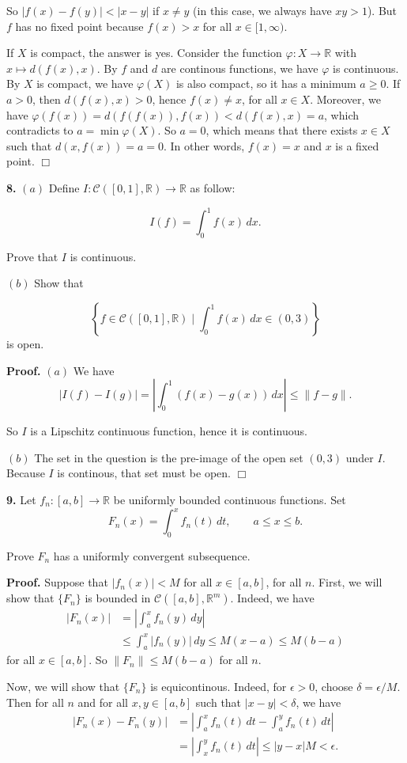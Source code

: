 \documentclass{article}
\begin{document}
So $|f(x) - f(y)| < |x-y|$ if $x\ne y$ (in this case, we always have
$xy > 1$). But $f$ has no fixed point because $f(x) > x$ for all
$x\in [1,\infty)$.

If $X$ is compact, the answer is yes. Consider the function
$\varphi : X\to\mathbb{R}$ with $x\mapsto d(f(x),x)$. By $f$ and $d$ are
continous functions, we have $\varphi$ is continuous. By $X$ is compact,
we have $\varphi(X)$ is also compact, so it has a minimum $a\ge 0$. If
$a > 0$, then $d(f(x),x) > 0$, hence $f(x) \ne x$, for all $x\in X$.
Moreover, we have $\varphi(f(x)) = d(f(f(x)),f(x)) < d(f(x),x) = a$,
which contradicts to $a = \min \varphi(X)$. So $a= 0$, which means that
there exists $x\in X$ such that $d(x,f(x)) = a= 0$. In other words,
$f(x) = x$ and $x$ is a fixed point. $\Box$

    \textbf{8.} $(a)$ Define
$I : \mathcal{C}([0,1], \mathbb{R}) \to \mathbb{R}$ as follow:

\[I(f) =\int_0^1 f(x)\,dx.\]

Prove that $I$ is continuous.

$(b)$ Show that

\[\left\{ f\in\mathcal{C}([0,1], \mathbb{R}) \mid \int_0^1 f(x) \, dx \in (0,3)\right\} \]
is open.

\textbf{Proof.} $(a)$ We have
\[| I(f) - I(g) | = \left|\int_0^1 (f(x) - g(x)) \,dx \right| \le \|f - g\|.\]

So $I$ is a Lipschitz continuous function, hence it is continuous.

$(b)$ The set in the question is the pre-image of the open set $(0,3)$
under $I$. Because $I$ is continous, that set must be open. $\Box$

    \textbf{9.} Let $f_n:[a,b]\to \mathbb{R}$ be uniformly bounded
continuous functions. Set
\[F_n(x) = \int_0^x f_n(t)\,dt,\qquad a\le x \le b.\]

Prove $F_n$ has a uniformly convergent subsequence.

\textbf{Proof.} Suppose that $|f_n(x)| < M$ for all $x\in [a,b]$, for
all $n$. First, we will show that $\{F_n\}$ is bounded in
$\mathcal{C}([a,b],\mathbb{R}^m)$. Indeed, we have \[\begin{aligned}
|F_n(x)| &= \left| \int_a^x f_n(y) \,dy\right| \\
&\le \int_a^x |f_n(y)|\,dy \le M(x-a)\le M(b-a)
\end{aligned}\] for all $x\in [a,b]$. So $\|F_n\| \le M(b-a)$ for all
$n$.

Now, we will show that $\{F_n\}$ is equicontinous. Indeed, for
$\epsilon > 0$, choose $\delta= \epsilon / M$. Then for all $n$ and for
all $x,y\in [a,b]$ such that $|x-y| < \delta$, we have \[\begin{aligned}
|F_n(x) - F_n(y)| &= \left| \int_a^x f_n(t)\, dt - \int_a^y f_n(t)\,dt\right|\\
&= \left|\int_x^y f_n(t)\,dt\right| \le |y-x|M < \epsilon.
\end{aligned}\]
\end{document}

